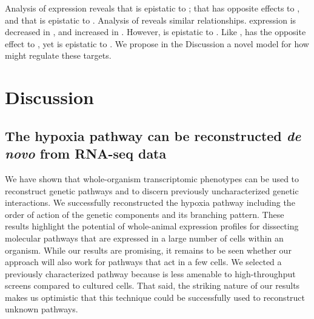 Analysis of \ftna{} expression reveals that  is epistatic to
; that  has opposite effects to , and that
 is epistatic to . Analysis of \nlp{} reveals similar
relationships. \nlp{} expression is decreased in \hif{}, and increased in
\egl{}. However,  is epistatic to . Like \ftna{},
 has the opposite effect to , yet is epistatic to
. We propose in the Discussion a novel model for how \hifp{} might
regulate these targets.


\section*{Discussion}
\label{sec:hyp_discussion}
\subsection*{The \cel{} hypoxia pathway can be reconstructed \emph{de novo} from
             RNA-seq data}
We have shown that whole-organism transcriptomic phenotypes can
be used to reconstruct genetic pathways and to discern previously
uncharacterized genetic interactions. We successfully reconstructed the hypoxia
pathway including the order of action of the genetic components and its
branching pattern.
These results highlight the potential of whole-animal
expression profiles for dissecting molecular pathways that are expressed in a
large number of cells within an organism. While our results are promising, it
remains to be seen whether our approach will also work for pathways that act in
a few cells. We selected a previously characterized pathway because \cel{} is
less amenable to high-throughput screens compared to cultured cells. That said,
the striking nature of our results makes us optimistic that this technique could
be successfully used to reconstruct unknown pathways.

